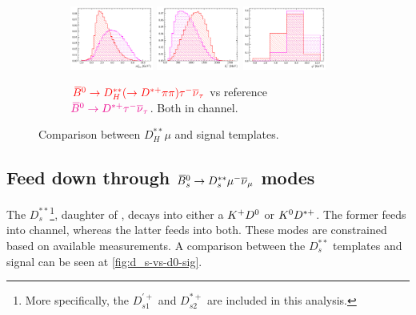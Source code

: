 \begin{figure}[!htb]
    \begin{subfigure}{\textwidth}
        \centering
        \includegraphics[width=0.3\textwidth]{figs-fit-fit-templates/histo-comp/Dst_iso_DstTau__vs__Dst_iso_DststHMuDst__m2miss.pdf}
        \includegraphics[width=0.3\textwidth]{figs-fit-fit-templates/histo-comp/Dst_iso_DstTau__vs__Dst_iso_DststHMuDst__el.pdf}
        \includegraphics[width=0.3\textwidth]{figs-fit-fit-templates/histo-comp/Dst_iso_DstTau__vs__Dst_iso_DststHMuDst__q2.pdf}
        \caption{
            $\textcolor{red}{{{\kern 0.18em\overline{\kern -0.18em B}}{}^0} \rightarrow {\ensuremath{D}}_H^{**} (\rightarrow {\ensuremath{{D}^{*+}}}\pi\pi) {\tau^-}{{\overline{\nu}}_\tau}}$
            vs reference
            $\textcolor{magenta}{{{\kern 0.18em\overline{\kern -0.18em B}}{}^0} \rightarrow {\ensuremath{{D}^{*+}}}{\ensuremath{\tau^-}}{\ensuremath{{\overline{\nu}}_\tau}}}$.
            Both in \Dstar channel.
        }
    \end{subfigure}

    \caption{Comparison between $D_H^{**}\mu$ and \Dz\taum signal templates.}
    \label{fig:dstst-heavy}
\end{figure}


\subsection{Feed down through ${{\kern 0.18em\overline{\kern -0.18em B}}{}^0_{s}} \rightarrow D_s^{**}{\mu^-}{{\overline{\nu}}_\mu}$ modes}

The $D_s^{**}$\footnote{
    More specifically, the $D_{s1}^{'+}$ and $D_{s2}^{*+}$ are included in
    this analysis.
}, daughter of \Bsb, decays into either a ${{K}^+}{{D}^0}$ or ${{K}^0}{{D}^{*+}}$.
The former feeds into \Dz channel, whereas the latter feeds into both.
These modes are constrained based on available measurements.
A comparison between the $D_s^{**}$ templates and \Dz\taum signal can be
seen at \cref{fig:d_s-vs-d0-sig}.

